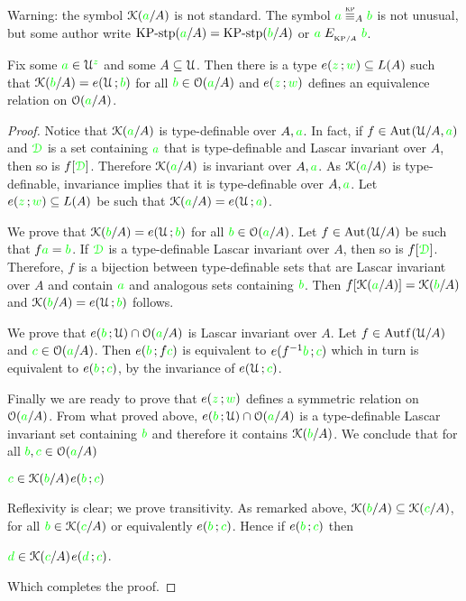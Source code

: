 \noindent\llap{\textcolor{red}{\Large\warning}\kern1.5ex}%
Warning: the symbol $\EuScript K({\color{green} a}/A)$ is not standard.
The symbol ${\gr a}\equivKP_A{\gr b}$ is not unusual, but some author write $\mbox{KP-stp}({\color{green} a}/A)=\mbox{KP-stp}({\color{green} b}/A)$ or ${\color{green} a}\mathrel{E_{_{{\rm KP}/A}}}{\color{green} b}$.

\begin{proposition}\label{prop_bardotto}
  Fix some ${\color{green} a}\in\EuScript U^{\color{green} z}$ and some $A\subseteq\EuScript U$.
Then there is a type $e({\color{green} z}\,;{\color{green} w})\subseteq L(A)$ such that $\EuScript K({\color{green} b}/A)=e(\EuScript U\,;{\color{green} b})$ for all ${\color{green} b}\in\EuScript O({\color{green} a}/A)$ and $e({\color{green} z}\,;{\color{green} w})$ defines an equivalence relation on $\EuScript O({\color{green} a}/A)$.
\end{proposition}

\begin{proof}
  Notice that $\EuScript K({\color{green} a}/A)$ is type-definable over $A,{\color{green} a}$.
  In fact, if $f\in{\rm Aut\kern.15ex}(\EuScript U/A,{\color{green} a})$ and ${\color{green}\EuScript D}$ is a set containing ${\color{green} a}$ that is type-definable and Lascar invariant over $A$, then so is $f[{\color{green}\EuScript D}]$.
  Therefore $\EuScript K({\color{green} a}/A)$ is invariant over $A,{\color{green} a}$.
  As $\EuScript K({\color{green} a}/A)$ is type-definable, invariance implies that it is type-definable over $A,{\color{green} a}$.
  Let $e({\color{green} z}\,;{\color{green} w})\subseteq L(A)$ be such that $\EuScript K({\color{green} a}/A)=e(\EuScript U\,;{\color{green} a})$. 
    
  We prove that $\EuScript K({\color{green} b}/A)=e(\EuScript U\,;{\color{green} b})$ for all ${\color{green} b}\in\EuScript O({\color{green} a}/A)$.
  Let $f\in{\rm Aut\kern.15ex}(\EuScript U/A)$ be such that $f{\color{green} a}={\color{green} b}$.
  If ${\color{green}\EuScript D}$ is a type-definable Lascar invariant over $A$, then so is $f[{\color{green}\EuScript D}]$.
  Therefore, $f$ is a bijection between type-definable sets that are Lascar invariant over $A$ and contain ${\color{green} a}$ and analogous sets containing ${\color{green} b}$.
  Then $f[\EuScript K({\color{green} a}/A)]=\EuScript K({\color{green} b}/A)$ and $\EuScript K({\color{green} b}/A)=e(\EuScript U\,;{\color{green} b})$ follows.
    
  We prove that $e({\color{green} b}\,;\EuScript U)\cap \EuScript O({\color{green} a}/A)$ is Lascar invariant over $A$.
  Let $f\in\mathord{\rm Aut\kern.15ex{f}\kern.15ex}(\EuScript U/A)$ and ${\color{green} c}\in\EuScript O({\color{green} a}/A)$.
  Then $e({\color{green} b}\,;f{\color{green} c})$ is equivalent to  $e(f^{-1}{\color{green} b}\,;{\color{green} c})$ which in turn is equivalent to $e({\color{green} b}\,;{\color{green} c})$, by the invariance of $e(\EuScript U\,;{\color{green} c})$. 
    
  Finally we are ready to prove that $e({\color{green} z}\,;{\color{green} w})$ defines a symmetric relation on $\EuScript O({\color{green} a}/A)$.
  From what proved above, $e({\color{green} b}\,;\EuScript U)\cap \EuScript O({\color{green} a}/A)$ is a type-definable Lascar invariant set containing ${\color{green} b}$ and therefore it contains $\EuScript K({\color{green} b}/A)$.
  We conclude that for all ${\color{green} b},{\color{green} c}\in\EuScript O({\color{green} a}/A)$
    
  \medrel{\iff}${\color{green} c}\in\EuScript K({\color{green} b}/A)$\medrel{\imp}$e({\color{green} b}\,;{\color{green} c})$
    
  Reflexivity is clear; we prove transitivity.
  As remarked above, $\EuScript K({\color{green} b}/A)\subseteq\EuScript K({\color{green} c}/A)$, for all ${\color{green} b}\in\EuScript K({\color{green} c}/A)$ or equivalently $e({\color{green} b}\,;{\color{green} c})$.
  Hence if $e({\color{green} b}\,;{\color{green} c})$ then
  
  \medrel{\iff}${\color{green} d}\in\EuScript K({\color{green} c}/A)$\medrel{\imp}$e({\color{green} d}\,;{\color{green} c})$.
    
  Which completes the proof.
\end{proof}

